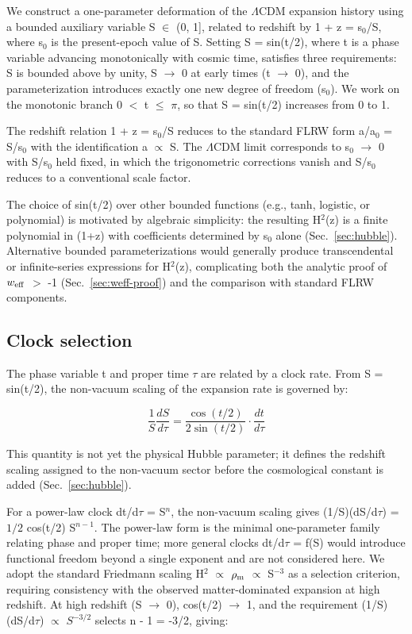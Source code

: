 We construct a one-parameter deformation of the $\Lambda$CDM expansion history
using a bounded auxiliary variable S $\in$ (0, 1{]}, related to redshift by
1 + z = s$_0$/S, where s$_0$ is the present-epoch value of S. Setting S =
sin(t/2), where t is a phase variable advancing monotonically with
cosmic time, satisfies three requirements: S is bounded above by unity,
S $\to$ 0 at early times (t $\to$ 0), and the parameterization introduces
exactly one new degree of freedom (s$_0$). We work on the monotonic branch
0 $<$ t $\leq$ $\pi$, so that S = sin(t/2) increases from 0 to 1.

The redshift relation 1 + z = s$_0$/S reduces to the standard FLRW form
a/a$_0$ = S/s$_0$ with the identification a $\propto$ S. The $\Lambda$CDM limit corresponds to
s$_0$ $\to$ 0 with S/s$_0$ held fixed, in which the trigonometric corrections
vanish and S/s$_0$ reduces to a conventional scale factor.

The choice of sin(t/2) over other bounded functions (e.g., tanh,
logistic, or polynomial) is motivated by algebraic simplicity: the
resulting H$^2$(z) is a finite polynomial in (1+z) with coefficients
determined by s$_0$ alone (Sec.~\ref{sec:hubble}). Alternative bounded parameterizations
would generally produce transcendental or infinite-series expressions
for H$^2$(z), complicating both the analytic proof of $w_{\rm eff}$ $>$
-1 (Sec.~\ref{sec:weff-proof}) and the comparison with standard FLRW components.

\subsection{Clock selection}\label{sec:clock}

The phase variable t and proper time $\tau$ are related by a clock rate. From
S = sin(t/2), the non-vacuum scaling of the expansion rate is governed
by:

\[\frac{1}{S}\frac{dS}{d\tau} = \frac{\cos(t/2)}{2\sin(t/2)} \cdot \frac{dt}{d\tau}\]

This quantity is not yet the physical Hubble parameter; it defines the
redshift scaling assigned to the non-vacuum sector before the
cosmological constant is added (Sec.~\ref{sec:hubble}).

For a power-law clock dt/d$\tau$ = S$^n$, the non-vacuum scaling gives
(1/S)(dS/d$\tau$) = $1/2$ cos(t/2) S$^{n-1}$. The power-law form is the minimal
one-parameter family relating phase and proper time; more general clocks
dt/d$\tau$ = f(S) would introduce functional freedom beyond a single exponent
and are not considered here. We adopt the standard Friedmann scaling H$^2$
$\propto$ $\rho_{\rm m}$ $\propto$ S$^{-3}$ \cite{ref15} as a selection criterion, requiring consistency
with the observed matter-dominated expansion at high redshift. At high
redshift (S $\to$ 0), cos(t/2) $\to$ 1, and the requirement (1/S)(dS/d$\tau$) $\propto$ $S^{-3/2}$
selects n - 1 = -3/2, giving:

